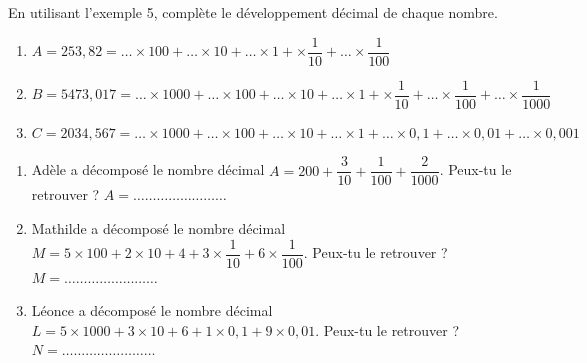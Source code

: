 \begin{pageAD} 




En utilisant l'exemple 5, complète le développement décimal de chaque nombre.
\begin{enumerate}

\item $A = 253,82 = \ldots \times 100 + \ldots \times 10 + \ldots  \times 1 +  \times\dfrac{1}{10} + \ldots \times\dfrac{1}{100} $

\item $B = 5473,017 = \ldots \times 1000 + \ldots \times 100 + \ldots \times 10 + \ldots  \times 1 +  \times\dfrac{1}{10} + \ldots \times\dfrac{1}{100}+ \ldots \times\dfrac{1}{1000} $ \vspace{0.2cm}


\item $C = 2034,567 = \ldots \times 1000 + \ldots \times 100 + \ldots \times 10 + \ldots  \times 1 +  \ldots \times 0,1 + \ldots \times 0,01+ \ldots \times 0,001 $


\end{enumerate}





\begin{enumerate}

\item Adèle a décomposé le nombre décimal  $A = 200 + \dfrac{3}{10} + \dfrac{1}{100} +  \dfrac{2}{1000} $. Peux-tu le retrouver ?
$A= \ldots\ldots\ldots\ldots\ldots\ldots\ldots\ldots $

\item Mathilde a décomposé le nombre décimal  $M = 5\times 100 + 2\times 10 + 4 + 3\times \dfrac{1}{10} +  6\times \dfrac{1}{100} $. Peux-tu le retrouver ?
$M = \ldots\ldots\ldots\ldots\ldots\ldots\ldots\ldots $

\item Léonce a décomposé le nombre décimal  $L = 5\times 1000 + 3\times 10 + 6 +  1\times 0,1 +  9\times 0,01 $. Peux-tu le retrouver ?
$N = \ldots\ldots\ldots\ldots\ldots\ldots\ldots\ldots $

\end{enumerate}


\vspace{0.4cm}



\end{pageAD}
